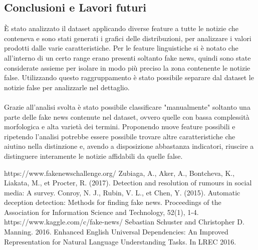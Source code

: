 \documentclass{article}
\begin{document}
\begin{multicols}{2}
		\section{Conclusioni e Lavori futuri}	
		È stato analizzato il dataset applicando diverse feature a tutte le notizie che conteneva e sono stati generati i grafici delle distribuzioni, per analizzare i valori prodotti dalle varie caratteristiche. Per le feature linguistiche si è notato che all'interno di un certo range erano presenti soltanto fake news, quindi sono state considerate assieme per isolare in modo più preciso la zona contenente le notizie false. Utilizzando questo raggruppamento è stato possibile separare dal dataset le notizie false per analizzarle nel dettaglio.
		\\~\\
		Grazie all'analisi svolta è stato possibile classificare "manualmente" soltanto una parte delle fake news contenute nel dataset, ovvero quelle con bassa complessità morfologica e alta varietà dei termini. Proponendo nuove feature possibili e ripetendo l'analisi potrebbe essere possibile trovare altre caratteristiche che aiutino nella distinzione e, avendo a disposizione abbastanza indicatori, riuscire a distinguere interamente le notizie affidabili da quelle false.
	   	\end{multicols}		    
		\begin{thebibliography}{9}
				https://www.fakenewschallenge.org/
			Zubiaga, A., Aker, A., Bontcheva, K., Liakata, M., et Procter, R. (2017). Detection and resolution of rumours in social	media: A survey.
			Conroy, N. J., Rubin, V. L., et Chen, Y. (2015). Automatic deception detection: Methods for finding fake news.
			Proceedings of the Association for Information Science and Technology, 52(1), 1-4.
				https://www.kaggle.com/c/fake-news/
				 Sebastian Schuster and Christopher D. Manning. 2016. Enhanced English Universal Dependencies: An Improved Representation for Natural Language Understanding Tasks. In LREC 2016. 
		\end{thebibliography}
\end{document}
